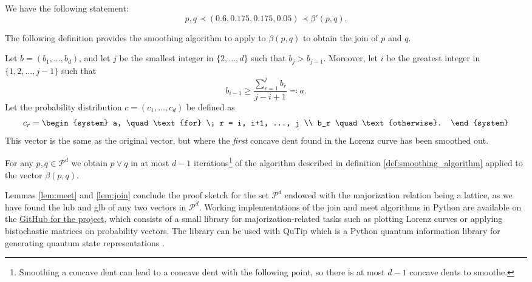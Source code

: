 \noindent We have the following statement:
\begin{equation}
    p, q \prec (0.6, 0.175, 0.175, 0.05) \prec \beta'(p, q).
\end{equation}

\noindent The following definition provides the smoothing algorithm to apply to $\beta(p, q)$ to obtain the join of $p$ and $q$.

\begin{definition} \label{def:smoothing_algorithm}
    Let $b = (b_1, ..., b_d)$, and let $j$ be the smallest integer in $\{2,...,d\}$ such that $b_j > b_{j-1}$. Moreover, let $i$ be the greatest integer in $\{1, 2, ..., j-1\}$ such that
    \begin{equation}
        b_{i-1} \geq \frac{\sum_{r=1}^{j}b_r}{j-i+1} \eqqcolon a.
    \end{equation}
    Let the probability distribution $c = (c_1, ..., c_d)$ be defined as
    \begin{equation}
        c_r = \begin{system}
                a, \quad \text{for} \; r = i, i+1, ..., j \\ %
                b_r \quad \text{otherwise}.
              \end{system}
    \end{equation}
    This vector is the same as the original vector, but where the \textit{first} concave dent found in the Lorenz curve has been smoothed out.
\end{definition}

\begin{lemma} \label{lem:join}
    For any $p, q \in \mathcal{P}^d$ we obtain $p \vee q$ in at most $d-1$ iterations\footnote{Smoothing a concave dent can lead to a concave dent with the following point, so there is at most $d-1$ concave dents to smoothe.} of the algorithm described in definition \ref{def:smoothing_algorithm} applied to the vector $\beta(p, q)$.
\end{lemma}

Lemmas \ref{lem:meet} and \ref{lem:join} conclude the proof sketch for the set $\mathcal{P}^d$ endowed with the majorization relation being a lattice, as we have found the lub and glb of any two vectors in $\mathcal{P}^d$. Working implementations of the join and meet algorithms in Python are available on the \href{https://github.com/traaldbjerg/MajoLat}{GitHub for the project}, which consists of a small library for majorization-related tasks such as plotting Lorenz curves or applying bistochastic matrices on probability vectors. The library can be used with QuTip which is a Python quantum information library for generating quantum state representations \cite{lambert_qutip_2024}.


